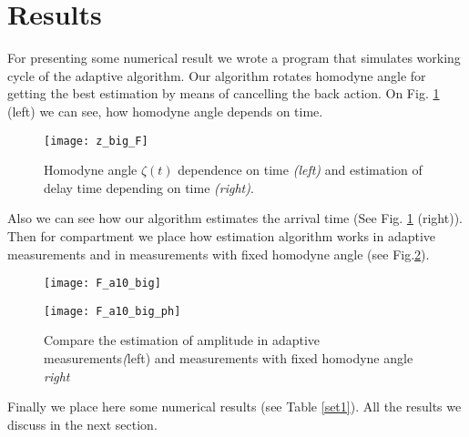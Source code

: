  \section{Results}
For presenting some numerical result we wrote a program that simulates working cycle of the adaptive algorithm.
Our algorithm rotates homodyne angle for getting the best estimation by means of cancelling the back action. On Fig. \ref{alpha_10} (left) we can see, how homodyne angle depends on time.
\begin{figure}[t]
 \begin{minipage}{0.5\linewidth}
  \texttt{[image: z\_big\_F]}
 \end{minipage}
\hfill
 \begin{minipage}{0.5\linewidth}
 \end{minipage}
\caption{Homodyne angle $\zeta(t)$ dependence on time \textit{(left)} and estimation of delay time depending on time \textit{(right)}.}
\label{alpha_10}
 \end{figure}
Also we can see how our algorithm estimates the arrival time (See  Fig. \ref{alpha_10} (right)). Then for compartment we place how estimation algorithm works in adaptive measurements and in measurements with fixed homodyne angle (see Fig.\ref{FbAb}).
\begin{figure}[h]
 \begin{minipage}{0.5\textwidth}
  \texttt{[image: F\_a10\_big]}
 \end{minipage}
\hfill
 \begin{minipage}{0.5\textwidth}
  \texttt{[image: F\_a10\_big\_ph]}
 \end{minipage}
\caption{Compare the estimation of amplitude in adaptive measurements\textit(left) and measurements with fixed homodyne angle \textit{right}}
\label{FbAb}
\end{figure}
Finally we place here some numerical results (see Table \ref{set1}). All the results we discuss in the next section.
\begin{table}[h!]
\caption{$\tau = 0.9, F = 51.1, N = 1000,T=6.6$}
\label{set1}
\end{table}